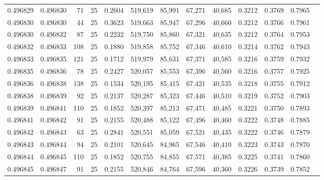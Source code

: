 \begin{tabular}{rrrrrrrrrrrrr}
0.496829 & 0.496830 &    71 &  25 &                                     0.2604 & 519,619 &  85,991 &  67,271 &  40,685 & 0.3212 & 0.3769 & 0.7965 \\
0.496830 & 0.496830 &    44 &  25 &                                     0.3623 & 519,663 &  85,947 &  67,296 &  40,660 & 0.3212 & 0.3766 & 0.7961 \\
0.496830 & 0.496832 &    87 &  25 &                                     0.2232 & 519,750 &  85,860 &  67,321 &  40,635 & 0.3212 & 0.3764 & 0.7953 \\
0.496832 & 0.496833 &   108 &  25 &                                     0.1880 & 519,858 &  85,752 &  67,346 &  40,610 & 0.3214 & 0.3762 & 0.7943 \\
0.496833 & 0.496835 &   121 &  25 &                                     0.1712 & 519,979 &  85,631 &  67,371 &  40,585 & 0.3216 & 0.3759 & 0.7932 \\
0.496835 & 0.496836 &    78 &  25 &                                     0.2427 & 520,057 &  85,553 &  67,396 &  40,560 & 0.3216 & 0.3757 & 0.7925 \\
0.496836 & 0.496838 &   138 &  25 &                                     0.1534 & 520,195 &  85,415 &  67,421 &  40,535 & 0.3218 & 0.3755 & 0.7912 \\
0.496838 & 0.496839 &    92 &  25 &                                     0.2137 & 520,287 &  85,323 &  67,446 &  40,510 & 0.3219 & 0.3752 & 0.7903 \\
0.496839 & 0.496841 &   110 &  25 &                                     0.1852 & 520,397 &  85,213 &  67,471 &  40,485 & 0.3221 & 0.3750 & 0.7893 \\
0.496841 & 0.496842 &    91 &  25 &                                     0.2155 & 520,488 &  85,122 &  67,496 &  40,460 & 0.3222 & 0.3748 & 0.7885 \\
0.496842 & 0.496843 &    63 &  25 &                                     0.2841 & 520,551 &  85,059 &  67,521 &  40,435 & 0.3222 & 0.3746 & 0.7879 \\
0.496843 & 0.496844 &    94 &  25 &                                     0.2101 & 520,645 &  84,965 &  67,546 &  40,410 & 0.3223 & 0.3743 & 0.7870 \\
0.496844 & 0.496845 &   110 &  25 &                                     0.1852 & 520,755 &  84,855 &  67,571 &  40,385 & 0.3225 & 0.3741 & 0.7860 \\
0.496845 & 0.496847 &    91 &  25 &                                     0.2155 & 520,846 &  84,764 &  67,596 &  40,360 & 0.3226 & 0.3739 & 0.7852 \\

\end{tabular}
